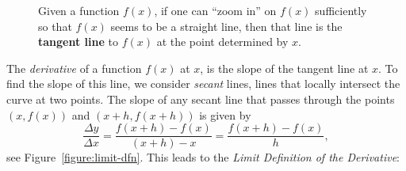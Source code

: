 \begin{figure*}
\caption{Given a function $f(x)$, if one can ``zoom in''
on $f(x)$ sufficiently so that $f(x)$ seems to be a straight line,
then that line is the \textbf{tangent line} to $f(x)$ at the point
determined by $x$.}
\label{figure:informal-tangent}
\end{figure*}


The \textit{derivative} of a function $f(x)$ at $x$, is the slope of
the tangent line at $x$. To find the slope of this line, we consider
\textit{secant} lines, lines that locally intersect the curve at two
points.  The slope of any secant line that passes through the points
$(x,f(x))$ and $(x+h, f(x+h))$ is given by
\[
\frac{\Delta y}{\Delta x}=\frac{f(x+h) -f(x)}{(x+h)-x} = \frac{f(x+h)-f(x)}{h},
\]
see Figure~\ref{figure:limit-dfn}. This leads to the \textit{Limit Definition of the Derivative}:

